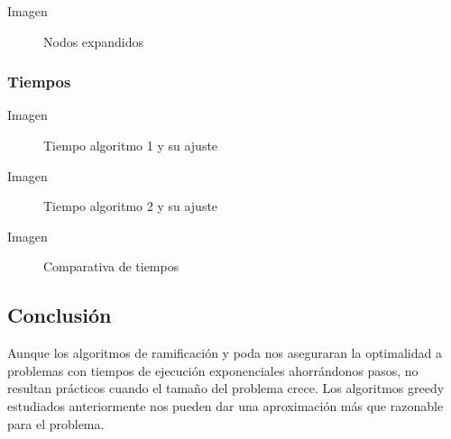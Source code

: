 \begin{frame}
	\begin{exampleblock}{Imagen}
	\begin{figure}[H]
    		\centering
    		\caption{Nodos expandidos}
	\end{figure}
	\end{exampleblock}
\end{frame}


\subsubsection{Tiempos}
\begin{frame}
	\begin{exampleblock}{Imagen}
	\begin{figure}[H]
    		\centering
    		\caption{Tiempo algoritmo 1 y su ajuste}
	\end{figure}
	\end{exampleblock}
\end{frame}

\begin{frame}
	\begin{exampleblock}{Imagen}
	\begin{figure}[H]
    		\centering
    		\caption{Tiempo algoritmo 2 y su ajuste}
	\end{figure}
	\end{exampleblock}
\end{frame}


\begin{frame}
	\begin{exampleblock}{Imagen}
	\begin{figure}[H]
    		\centering
    		\caption{Comparativa de tiempos}
	\end{figure}
	\end{exampleblock}
\end{frame}



\subsection{Conclusión}
\begin{frame}
	\begin{alertblock}
	Aunque los algoritmos de ramificación y poda nos aseguraran la optimalidad a problemas con
	tiempos de ejecución exponenciales ahorrándonos pasos, no resultan prácticos cuando el tamaño
	del problema crece. Los algoritmos greedy estudiados anteriormente nos pueden dar una 
	aproximación más que razonable para el problema.
	\end{alertblock}
\end{frame}
